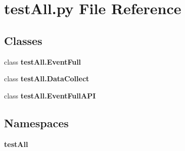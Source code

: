 \section{test\+All.\+py File Reference}
\label{test_all_8py}
\subsection*{Classes}
\begin{DoxyCompactItemize}
\item 
class {\bf test\+All.\+Event\+Full}
\item 
class {\bf test\+All.\+Data\+Collect}
\item 
class {\bf test\+All.\+Event\+Full\+A\+PI}
\end{DoxyCompactItemize}
\subsection*{Namespaces}
\begin{DoxyCompactItemize}
\item 
 {\bf test\+All}
\end{DoxyCompactItemize}
